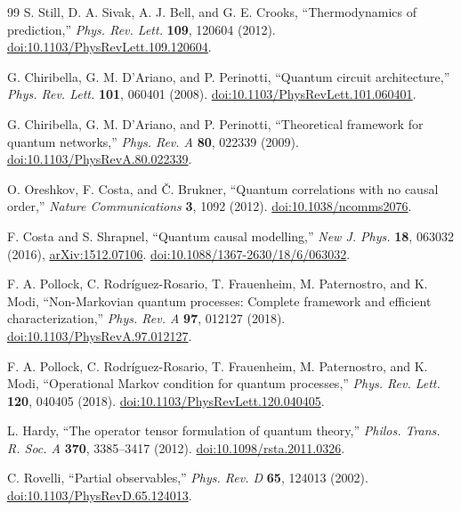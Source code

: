 \documentclass[11pt]{article}
\begin{document}
\begin{thebibliography}{99}
S. Still, D. A. Sivak, A. J. Bell, and G. E. Crooks,
``Thermodynamics of prediction,''
\emph{Phys. Rev. Lett.} \textbf{109}, 120604 (2012).
\href{https://doi.org/10.1103/PhysRevLett.109.120604}{doi:10.1103/PhysRevLett.109.120604}.

G. Chiribella, G. M. D'Ariano, and P. Perinotti,
``Quantum circuit architecture,''
\emph{Phys. Rev. Lett.} \textbf{101}, 060401 (2008).
\href{https://doi.org/10.1103/PhysRevLett.101.060401}{doi:10.1103/PhysRevLett.101.060401}.

G. Chiribella, G. M. D'Ariano, and P. Perinotti,
``Theoretical framework for quantum networks,''
\emph{Phys. Rev. A} \textbf{80}, 022339 (2009).
\href{https://doi.org/10.1103/PhysRevA.80.022339}{doi:10.1103/PhysRevA.80.022339}.

O. Oreshkov, F. Costa, and \v{C}. Brukner,
``Quantum correlations with no causal order,''
\emph{Nature Communications} \textbf{3}, 1092 (2012).
\href{https://doi.org/10.1038/ncomms2076}{doi:10.1038/ncomms2076}.

F. Costa and S. Shrapnel,
``Quantum causal modelling,''
\emph{New J. Phys.} \textbf{18}, 063032 (2016),
\href{https://arxiv.org/abs/1512.07106}{arXiv:1512.07106}.
\href{https://doi.org/10.1088/1367-2630/18/6/063032}{doi:10.1088/1367-2630/18/6/063032}.

F. A. Pollock, C. Rodr\'iguez-Rosario, T. Frauenheim, M. Paternostro, and K. Modi,
``Non-Markovian quantum processes: Complete framework and efficient characterization,''
\emph{Phys. Rev. A} \textbf{97}, 012127 (2018).
\href{https://doi.org/10.1103/PhysRevA.97.012127}{doi:10.1103/PhysRevA.97.012127}.

F. A. Pollock, C. Rodr\'iguez-Rosario, T. Frauenheim, M. Paternostro, and K. Modi,
``Operational Markov condition for quantum processes,''
\emph{Phys. Rev. Lett.} \textbf{120}, 040405 (2018).
\href{https://doi.org/10.1103/PhysRevLett.120.040405}{doi:10.1103/PhysRevLett.120.040405}.

L. Hardy,
``The operator tensor formulation of quantum theory,''
\emph{Philos. Trans. R. Soc. A} \textbf{370}, 3385--3417 (2012).
\href{https://doi.org/10.1098/rsta.2011.0326}{doi:10.1098/rsta.2011.0326}.

C. Rovelli,
``Partial observables,''
\emph{Phys. Rev. D} \textbf{65}, 124013 (2002).
\href{https://doi.org/10.1103/PhysRevD.65.124013}{doi:10.1103/PhysRevD.65.124013}.


\end{thebibliography}
\end{document}
